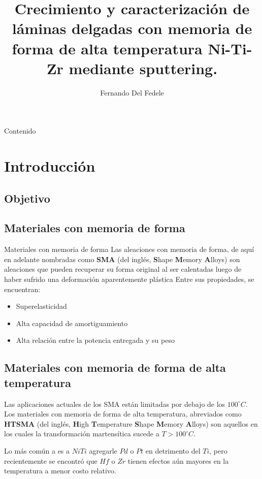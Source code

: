 \documentclass[11pt]{beamer}
\author{Fernando Del Fedele}
\title{Crecimiento y caracterización de
láminas delgadas con memoria de
forma de alta temperatura Ni-Ti-Zr
mediante sputtering.}
\begin{document}
\begin{frame}
\titlepage
\end{frame}

\begin{frame}{Contenido}
\tableofcontents
\end{frame}

\section{Introducción}

\subsection{Objetivo}
	\subsection{Materiales con memoria de forma}
		\begin{frame}{Materiales con memoria de forma}
			Las aleaciones con memoria de forma, de aquí en adelante nombradas como \textbf{SMA} (del inglés, \textbf{S}hape \textbf{M}emory \textbf{A}lloys) son aleaciones que pueden recuperar su forma original al ser calentadas luego de haber sufrido una deformación aparentemente plástica
			Entre sus propiedades, se encuentran:
			\begin{itemize}
				\item Superelasticidad
				\item Alta capacidad de amortiguamiento
				\item Alta relación entre la potencia entregada y su peso
			\end{itemize}
		\end{frame}
		
	\subsection{Materiales con memoria de forma de alta temperatura}
		\begin{frame}
			Las aplicaciones actuales de los SMA están limitadas por debajo de los $100^\circ C$. Los materiales con memoria de forma de alta temperatura, abreviados como \textbf{HTSMA} (del inglés, \textbf{H}igh \textbf{T}emperature \textbf{S}hape \textbf{M}emory \textbf{A}lloys) son aquellos en los cuales la transformación martensítica sucede a $T > 100^\circ C$.
			
			Lo más común a es a $NiTi$ agregarle $Pd$ o $Pt$ en detrimento del $Ti$, pero recientemente se encontró que $Hf$ o $Zr$ tienen efectos aún mayores en la temperatura a menor costo relativo.
		\end{frame}
	
\end{document}
